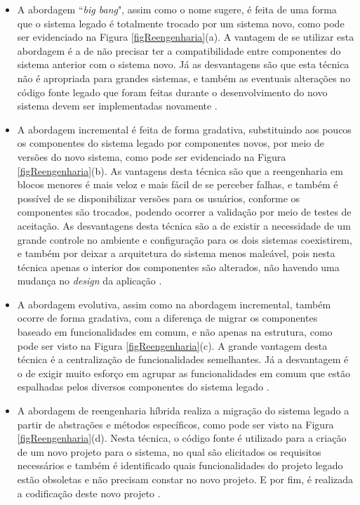\begin{itemize}
  
\item A abordagem “\textit{big bang}", assim como o nome sugere, é feita de uma forma que o sistema legado é totalmente trocado por um sistema novo, 
    como pode ser evidenciado na Figura \ref{figReengenharia}(a). A vantagem de se utilizar esta abordagem é a de não precisar ter a compatibilidade entre 
    componentes do sistema anterior com o sistema novo. Já as desvantagens são que esta técnica não é apropriada para grandes sistemas, e 
    também as eventuais alterações no código fonte legado que foram feitas durante o desenvolvimento do novo sistema devem ser implementadas 
    novamente \cite{rosenberg1996software}.

  \item A abordagem incremental é feita de forma gradativa, substituindo aos poucos os componentes do sistema legado por componentes novos, por 
    meio de versões do novo sistema, como pode ser evidenciado na Figura \ref{figReengenharia}(b). As vantagens desta técnica são que a reengenharia em blocos 
    menores é mais veloz e mais fácil de se perceber falhas, e também é possível de se disponibilizar versões para os usuários, conforme os 
    componentes são trocados, podendo ocorrer a validação por meio de testes de aceitação. As desvantagens desta técnica são a de existir a 
    necessidade de um grande controle no ambiente e configuração para os dois sistemas coexistirem, e também por deixar a arquitetura do 
    sistema menos maleável, pois nesta técnica apenas o interior dos componentes são alterados, não havendo uma mudança no \textit{design} da 
    aplicação \cite{rosenberg1996software}.

  \item A abordagem evolutiva, assim como na abordagem incremental, também ocorre de forma gradativa, com a diferença de migrar os componentes 
    baseado em funcionalidades em comum, e não apenas na estrutura, como pode ser visto na Figura \ref{figReengenharia}(c). A grande vantagem desta técnica é 
    a centralização de funcionalidades semelhantes. Já a desvantagem é o de exigir muito esforço em agrupar as funcionalidades em comum que 
    estão espalhadas pelos diversos componentes do sistema legado \cite{rosenberg1996software}.

  \item A abordagem de reengenharia híbrida realiza a migração do sistema legado a partir de abstrações e métodos específicos, 
    como pode ser visto na Figura \ref{figReengenharia}(d). Nesta técnica, o código fonte é utilizado para a criação de um novo projeto para o sistema, no qual 
    são elicitados os requisitos necessários e também é identificado quais funcionalidades do projeto legado estão obsoletas e não precisam 
    constar no novo projeto. E por fim, é realizada a codificação deste novo projeto \cite{rosenberg1996software}.

\end{itemize}

